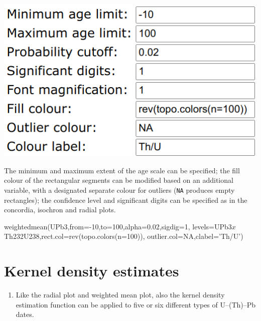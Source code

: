 \begin{refsection}
\begin{enumerate}
\noindent\begin{minipage}[t]{.45\linewidth}
\strut\vspace*{-\baselineskip}\newline
\includegraphics[width=\linewidth]{../figures/UPbWtdMeanExtraOptions.png}
\end{minipage}
\begin{minipage}[t]{.55\linewidth}
  The minimum and maximum extent of the age scale can be specified;
  the fill colour of the rectangular segments can be modified based on
  an additional variable, with a designated separate colour for
  outliers (\texttt{NA} produces empty rectangles); the confidence
  level and significant digits can be specified as in the concordia,
  isochron and radial plots.
\end{minipage}

\begin{script}
weightedmean(UPb3,from=-10,to=100,alpha=0.02,sigdig=1,
             levels=UPb3$x$Th232U238,rect.col=rev(topo.colors(n=100)),
             outlier.col=NA,clabel='Th/U')
\end{script}

\end{enumerate}

\section{Kernel density estimates}
\label{sec:UPbKDE}

\begin{enumerate}

\item Like the radial plot and weighted mean plot, also the kernel
  density estimation function can be applied to five or six different
  types of U--(Th)--Pb dates.


\end{enumerate}
\end{refsection}
